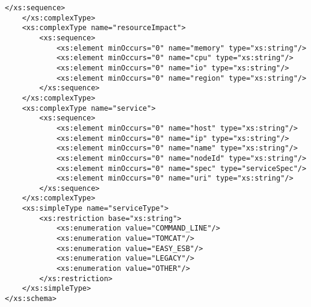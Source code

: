 {\begin{lstlisting}[frame=trbl, label=lst:xsd, caption=\emph{Schema} em formato XSD da Linguagem de Descrição Arquitetural utilizada no \ee]
        </xs:sequence>
    </xs:complexType>
    <xs:complexType name="resourceImpact">
        <xs:sequence>
            <xs:element minOccurs="0" name="memory" type="xs:string"/>
            <xs:element minOccurs="0" name="cpu" type="xs:string"/>
            <xs:element minOccurs="0" name="io" type="xs:string"/>
            <xs:element minOccurs="0" name="region" type="xs:string"/>
        </xs:sequence>
    </xs:complexType>
    <xs:complexType name="service">
        <xs:sequence>
            <xs:element minOccurs="0" name="host" type="xs:string"/>
            <xs:element minOccurs="0" name="ip" type="xs:string"/>
            <xs:element minOccurs="0" name="name" type="xs:string"/>
            <xs:element minOccurs="0" name="nodeId" type="xs:string"/>
            <xs:element minOccurs="0" name="spec" type="serviceSpec"/>
            <xs:element minOccurs="0" name="uri" type="xs:string"/>
        </xs:sequence>
    </xs:complexType>
    <xs:simpleType name="serviceType">
        <xs:restriction base="xs:string">
            <xs:enumeration value="COMMAND_LINE"/>
            <xs:enumeration value="TOMCAT"/>
            <xs:enumeration value="EASY_ESB"/>
            <xs:enumeration value="LEGACY"/>
            <xs:enumeration value="OTHER"/>
        </xs:restriction>
    </xs:simpleType>
</xs:schema>

\end{lstlisting}
}

